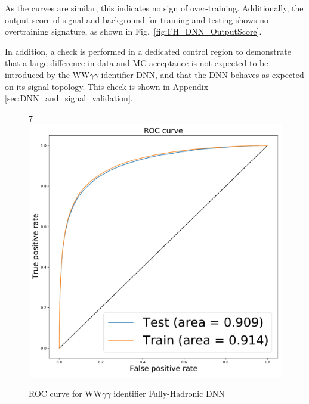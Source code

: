 As the curves are similar, this indicates no sign of over-training. Additionally, the output score of signal and background for training and testing shows no overtraining signature, as shown in Fig.~\ref{fig:FH_DNN_OutputScore}.

In addition, a check is performed in a dedicated control region to demonstrate that a large difference in data and MC acceptance is not expected to be introduced by the
WW$\gamma\gamma$ identifier DNN, and that the DNN behaves as expected on its signal topology. This check is shown in Appendix \ref{sec:DNN_and_signal_validation}.

\begin{figure}[!htbp]7
  \centering
  \includegraphics[scale=0.4]{Sections/HHWWgg/images/FH_DNN/WWgg/ROC.pdf}%
  \caption{ROC curve for WW$\gamma\gamma$ identifier Fully-Hadronic DNN}
  \label{fig:FH_DNN_ROC}
\end{figure}


